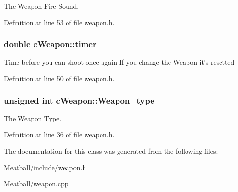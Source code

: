 The Weapon Fire Sound. 



Definition at line 53 of file weapon.\-h.

\hypertarget{classc_weapon_ad8adebfcb59e5f2cd61951f87691da6a}{
\subsubsection[{timer}]{\setlength{\rightskip}{0pt plus 5cm}double c\-Weapon\-::timer}}\label{classc_weapon_ad8adebfcb59e5f2cd61951f87691da6a}
Time before you can shoot once again If you change the Weapon it's resetted 

Definition at line 50 of file weapon.\-h.

\hypertarget{classc_weapon_a457996bcbe591da765dfb8b427a72f29}{
\subsubsection[{Weapon\-\_\-type}]{\setlength{\rightskip}{0pt plus 5cm}unsigned int c\-Weapon\-::\-Weapon\-\_\-type}}\label{classc_weapon_a457996bcbe591da765dfb8b427a72f29}


The Weapon Type. 



Definition at line 36 of file weapon.\-h.



The documentation for this class was generated from the following files\-:\begin{DoxyCompactItemize}
\item 
Meatball/include/\hyperlink{weapon_8h}{weapon.\-h}\item 
Meatball/\hyperlink{weapon_8cpp}{weapon.\-cpp}\end{DoxyCompactItemize}
